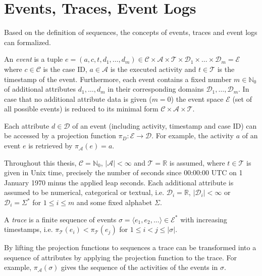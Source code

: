 \section{Events, Traces, Event Logs}

Based on the definition of sequences, the concepts of events, traces and event logs can formalized.

\begin{definition}[Event]
An  \textit{event} is a tuple $e = (a,c,t,d_1,\dots, d_m) \in \mathcal{C} \times \mathcal{A}  \times \mathcal{T} \times \mathcal{D}_1 \times \dots \times \mathcal{D}_m =  \mathcal{E}$ where  $c \in \mathcal{C} $ is the case ID, $a \in \mathcal{A}$ is the executed activity and $t \in \mathcal{T}$ is the timestamp of the event.
Furthermore, each event contains a fixed number $m \in \mathbb{N}_0$ of additional attributes $d_1, \dots, d_m$ in their corresponding domains $\mathcal{D}_1, \dots , \mathcal{D}_m$.
In case that no additional attribute data is given ($m = 0$) the event space $\mathcal{E}$ (set of all possible events) is reduced to its minimal form $\mathcal{C} \times \mathcal{A}  \times \mathcal{T}$.
\end{definition}

Each attribute $d \in \mathcal{D}$ of an event (including activity, timestamp and case ID) can be accessed by a projection function $\pi_D \colon \mathcal{E} \to \mathcal{D}$.
For example, the activity $a$ of an event $e$ is retrieved by $\pi_\mathcal{A}(e) = a$.

Throughout this thesis,  $\mathcal{C} = \mathbb{N}_0$, $|\mathcal{A}| < \infty$ and $ \mathcal{T} = \mathbb{R}$ is assumed, where $t \in \mathcal{T}$ is given in Unix time, precisely the number of seconds since 00:00:00 UTC on 1 January 1970 minus the applied leap seconds.
Each additional attribute is assumed to be numerical, categorical or textual, i.e. $\mathcal{D}_i = \mathbb{R}$, $|\mathcal{D}_i| < \infty$ or $\mathcal{D}_i = \Sigma^\ast$  for $1 \leq i \leq m$ and some fixed alphabet $\Sigma$.

\begin{definition}[Trace]
	A \textit{trace} is a finite sequence of events $\sigma = \langle e_1, e_2, \dots\rangle \in  \mathcal{E}^\ast$ with increasing timestamps, i.e. $\pi_\mathcal{T} (e_i) < \pi_\mathcal{T} (e_j) $ for $1 \leq i < j \leq |\sigma|$.
\end{definition}


By lifting the projection functions to sequences a trace can be transformed into a sequence of attributes by applying the projection function to the trace.
For example, $\pi_\mathcal{A}(\sigma)$ gives the sequence of the activities of the events in $\sigma$.

